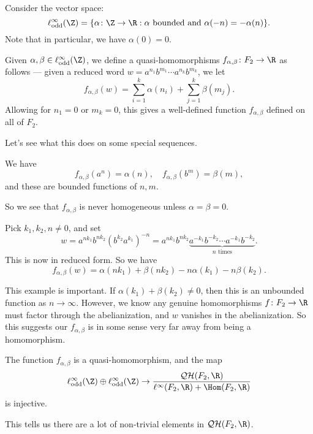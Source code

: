 \documentclass[a4paper]{article}
\newcommand\QH{\mathcal{QH}}
\newcommand\Free{F}
\begin{document}
Consider the vector space:
\[
  \ell_{\mathrm{odd}}^\infty (\Z) = \{\alpha\colon \Z \to \R : \alpha \text{ bounded and } \alpha(-n) = -\alpha (n)\}.
\]
Note that in particular, we have $\alpha(0) = 0$.

Given $\alpha, \beta \in \ell_{\mathrm{odd}}^\infty(\Z)$, we define a quasi-homomorphisms $f_{\alpha, \beta} \colon \Free_2 \to \R$ as follows --- given a reduced word $w = a^{n_1} b^{m_1} \cdots a^{n_k}b^{m_k}$, we let
\[
  f_{\alpha, \beta}(w) = \sum_{i= 1}^k \alpha(n_i) + \sum_{j = 1}^k \beta(m_j).
\]
Allowing for $n_1 = 0$ or $m_k = 0$, this gives a well-defined function $f_{\alpha,\beta}$ defined on all of $\Free_2$.

Let's see what this does on some special sequences.
\begin{eg}
  We have
  \[
    f_{\alpha, \beta}(a^n) = \alpha(n),\quad f_{\alpha, \beta}(b^m) = \beta(m),
  \]
  and these are bounded functions of $n, m$.
\end{eg}
So we see that $f_{\alpha, \beta}$ is never homogeneous unless $\alpha = \beta = 0$.

\begin{eg}
  Pick $k_1, k_2, n \not= 0$, and set
  \[
    w = a^{nk_1} b^{nk_2} (b^{k_2}a^{k_1})^{-n} = a^{nk_1} b^{nk_2} \underbrace{a^{-k_1} b^{-k_2} \cdots a^{-k_1} b^{-k_2}}_{n\text{ times}}.
  \]
  This is now in reduced form. So we have
  \[
    f_{\alpha, \beta}(w) = \alpha(n k_1) + \beta (n k_2) - n \alpha(k_1) - n \beta(k_2).
  \]
\end{eg}
This example is important. If $\alpha(k_1) + \beta(k_2) \not= 0$, then this is an unbounded function as $n \to \infty$. However, we know any genuine homomorphisms $f\colon \Free_2 \to \R$ must factor through the abelianization, and $w$ vanishes in the abelianization. So this suggests our $f_{\alpha, \beta}$ is in some sense very far away from being a homomorphism.

\begin{thm}[P.\ Rolli, 2009]
  The function $f_{\alpha, \beta}$ is a quasi-homomorphism, and the map
  \[
    \ell^\infty_{\mathrm{odd}} (\Z) \oplus \ell^\infty_{\mathrm{odd}}(\Z) \to \frac{\QH(\Free_2, \R)}{\ell^\infty(\Free_2, \R) + \Hom(\Free_2, \R)}
  \]
  is injective.
\end{thm}
This tells us there are a lot of non-trivial elements in $\QH(\Free_2, \R)$.
\end{document}
